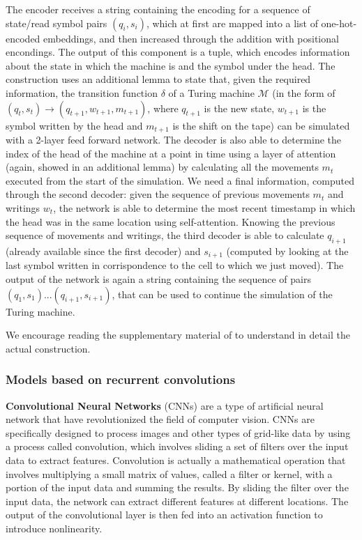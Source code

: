 \documentclass{article}
\begin{document}
The encoder receives a string containing the encoding for a sequence of state/read symbol pairs $(q_i,s_i)$, which at first are mapped into a list of one-hot-encoded embeddings, and then increased through the addition with positional encondings. The output of this component is a tuple, which encodes information about the state in which the machine is and the symbol under the head. The construction uses an additional lemma to state that, given the required information, the transition function $\delta$ of a Turing machine $\mathcal{M}$ (in the form of $(q_t,s_t) \to (q_{t+1}, w_{t+1}, m_{t+1})$, where $q_{t+1}$ is the new state, $w_{t+1}$ is the symbol written by the head and $m_{t+1}$ is the shift on the tape) can be simulated with a 2-layer feed forward network. The decoder is also able to determine the index of the head of the machine at a point in time using a layer of attention (again, showed in an additional lemma) by calculating all the movements $m_t$ executed from the start of the simulation. We need a final information, computed through the second decoder: given the sequence of previous movements $m_t$ and writings $w_t$, the network is able to determine the most recent timestamp in which the head was in the same location using self-attention. Knowing the previous sequence of movements and writings, the third decoder is able to calculate $q_{i+1}$ (already available since the first decoder) and $s_{i+1}$ (computed by looking at the last symbol written in corrispondence to the cell to which we just moved). The output of the network is again a string containing the sequence of pairs $(q_1,s_1)...(q_{i+1},s_{i+1})$, that can be used to continue the simulation of the Turing machine.

We encourage reading the supplementary material of \cite{PER19} to understand in detail the actual construction.

\subsubsection{Models based on recurrent convolutions}
\textbf{Convolutional Neural Networks} (CNNs) are a type of artificial neural network that have revolutionized the field of computer vision. CNNs are specifically designed to process images and other types of grid-like data by using a process called convolution, which involves sliding a set of filters over the input data to extract features. Convolution is actually a mathematical operation that involves multiplying a small matrix of values, called a filter or kernel, with a portion of the input data and summing the results. By sliding the filter over the input data, the network can extract different features at different locations. The output of the convolutional layer is then fed into an activation function to introduce nonlinearity.
\end{document}
